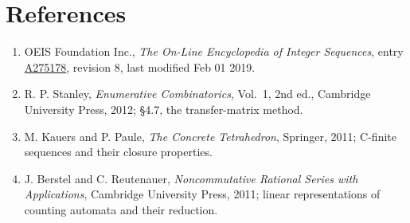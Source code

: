 \documentclass[11pt]{article}
\theoremstyle{definition}
\begin{document}
\section{References}

\begin{enumerate}

\item OEIS Foundation Inc., \emph{The On-Line Encyclopedia of Integer Sequences}, entry \href{https://oeis.org/A275178}{A275178}, revision 8, last modified Feb 01 2019.

\item R. P. Stanley, \emph{Enumerative Combinatorics}, Vol.~1, 2nd ed., Cambridge University Press, 2012; \S4.7, the transfer-matrix method.

\item M. Kauers and P. Paule, \emph{The Concrete Tetrahedron}, Springer, 2011; C-finite sequences and their closure properties.

\item J. Berstel and C. Reutenauer, \emph{Noncommutative Rational Series with Applications}, Cambridge University Press, 2011; linear representations of counting automata and their reduction.

\end{enumerate}
\end{document}
